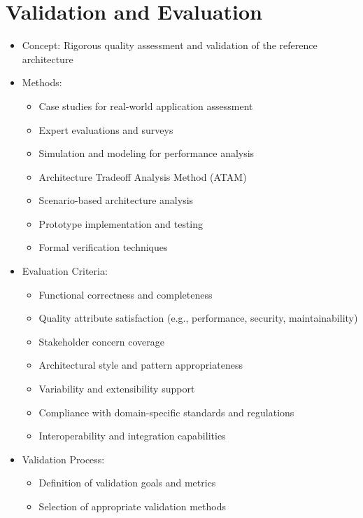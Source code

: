 \documentclass[12pt,a4paper]{article}
\begin{document}
\section{Validation and Evaluation}
\begin{itemize}
    \item Concept: Rigorous quality assessment and validation of the reference architecture
    \item Methods:
    \begin{itemize}
        \item Case studies for real-world application assessment \citep{Runeson2009}
        \item Expert evaluations and surveys \citep{Beecham2005}
        \item Simulation and modeling for performance analysis \citep{Martens2010}
        \item Architecture Tradeoff Analysis Method (ATAM) \citep{Kazman2000}
        \item Scenario-based architecture analysis \citep{Dobrica2002}
        \item Prototype implementation and testing \citep{Gorton2006}
        \item Formal verification techniques \citep{Baier2008}
    \end{itemize}
    \item Evaluation Criteria:
    \begin{itemize}
        \item Functional correctness and completeness
        \item Quality attribute satisfaction (e.g., performance, security, maintainability)
        \item Stakeholder concern coverage
        \item Architectural style and pattern appropriateness
        \item Variability and extensibility support
        \item Compliance with domain-specific standards and regulations \citep{Nakagawa2023}
        \item Interoperability and integration capabilities
    \end{itemize}
    \item Validation Process:
    \begin{itemize}
        \item Definition of validation goals and metrics
        \item Selection of appropriate validation methods

\end{itemize}
\end{itemize}
\end{document}
